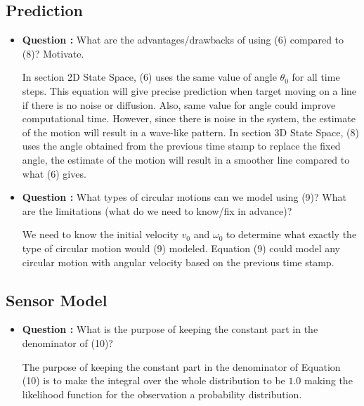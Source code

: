 \documentclass[11pt,a4paper]{article}
\begin{document}
\subsection{Prediction}
\begin{itemize}
	\item\addtocounter{Counter}{1}\textbf{Question :} What are the advantages/drawbacks of using (6) compared to (8)? Motivate.
		\par In section 2D State Space, (6) uses the same value of angle $\theta_{0}$ for all time steps. This equation will give precise prediction when target moving on a line if there is no noise or diffusion. Also, same value for angle could improve computational time. However, since there is noise in the system, the estimate of the motion will result in a wave-like pattern. In section 3D State Space, (8) uses the angle obtained from the previous time stamp to replace the fixed angle, the estimate of the motion will result in a smoother line compared to what (6) gives.

	\item\addtocounter{Counter}{1}\textbf{Question :} What types of circular motions can we model using (9)? What are the limitations (what do we need to know/fix in advance)?
		\par We need to know the initial velocity $v_{0}$ and $\omega_{0}$ to determine what exactly the type of circular motion would (9) modeled. Equation (9) could model any circular motion with angular velocity based on the previous time stamp.
\end{itemize}

\subsection{Sensor Model}
\begin{itemize}
	\item\addtocounter{Counter}{1}\textbf{Question :} What is the purpose of keeping the constant part in the denominator of (10)?
		\par The purpose of keeping the constant part in the denominator of Equation (10) is to make the integral over the whole distribution to be $1.0$ making the likelihood function for the observation a probability distribution.
\end{itemize}
\end{document}
